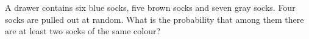A drawer contains six blue socks, five brown socks and seven gray socks. Four socks are pulled out at random. What is the probability that among them there are at least two socks of the same colour?
